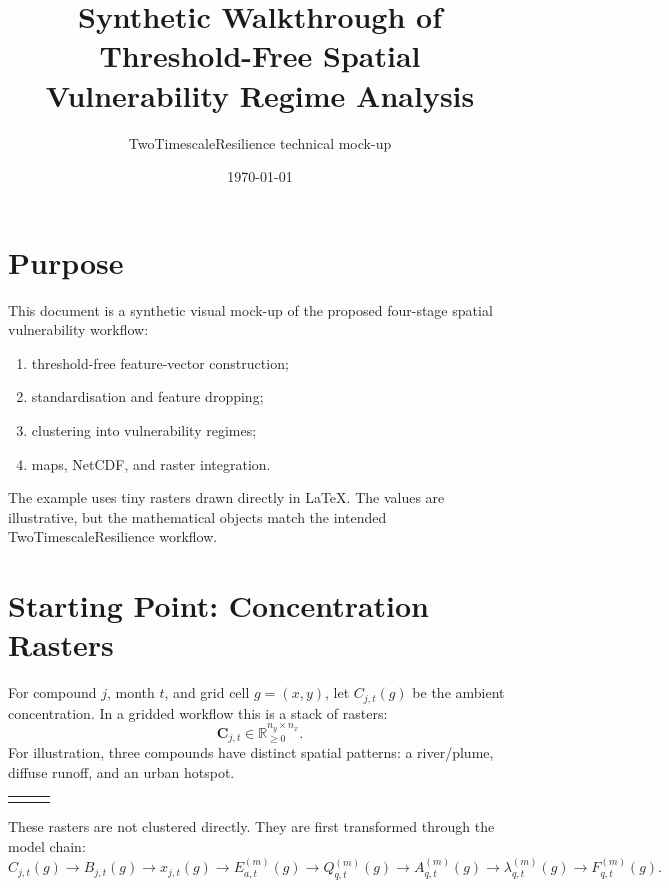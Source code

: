 \documentclass[11pt]{article}
\title{Synthetic Walkthrough of Threshold-Free Spatial Vulnerability Regime Analysis}
\author{TwoTimescaleResilience technical mock-up}
\date{\today}
\newcommand{\cellbox}[2]{\fill[#1] #2 rectangle ++(0.8,0.8);}
\newcommand{\gridframe}{\draw[black!40,step=0.8] (0,0) grid (4,4);}
\newcommand{\rastlabel}[1]{\node[font=\scriptsize,align=center] at (2,-0.35) {#1};}
\newcommand{\drawRasterCOne}{%
\begin{tikzpicture}[scale=0.58]
\cellbox{lowblue}{(0,0)} \cellbox{lowblue}{(0.8,0)} \cellbox{midblue}{(1.6,0)} \cellbox{midblue}{(2.4,0)} \cellbox{highblue}{(3.2,0)}
\cellbox{lowblue}{(0,0.8)} \cellbox{midblue}{(0.8,0.8)} \cellbox{midblue}{(1.6,0.8)} \cellbox{highblue}{(2.4,0.8)} \cellbox{highblue}{(3.2,0.8)}
\cellbox{lowblue}{(0,1.6)} \cellbox{midblue}{(0.8,1.6)} \cellbox{highblue}{(1.6,1.6)} \cellbox{highblue}{(2.4,1.6)} \cellbox{midblue}{(3.2,1.6)}
\cellbox{lowblue}{(0,2.4)} \cellbox{midblue}{(0.8,2.4)} \cellbox{midblue}{(1.6,2.4)} \cellbox{midblue}{(2.4,2.4)} \cellbox{lowblue}{(3.2,2.4)}
\cellbox{lowblue}{(0,3.2)} \cellbox{lowblue}{(0.8,3.2)} \cellbox{lowblue}{(1.6,3.2)} \cellbox{lowblue}{(2.4,3.2)} \cellbox{lowblue}{(3.2,3.2)}
\gridframe\rastlabel{$C_1$: river/plume}
\end{tikzpicture}}
\newcommand{\drawRasterCTwo}{%
\begin{tikzpicture}[scale=0.58]
\cellbox{lowgreen}{(0,0)} \cellbox{lowgreen}{(0.8,0)} \cellbox{lowgreen}{(1.6,0)} \cellbox{midgreen}{(2.4,0)} \cellbox{midgreen}{(3.2,0)}
\cellbox{lowgreen}{(0,0.8)} \cellbox{lowgreen}{(0.8,0.8)} \cellbox{midgreen}{(1.6,0.8)} \cellbox{midgreen}{(2.4,0.8)} \cellbox{highgreen}{(3.2,0.8)}
\cellbox{lowgreen}{(0,1.6)} \cellbox{midgreen}{(0.8,1.6)} \cellbox{midgreen}{(1.6,1.6)} \cellbox{highgreen}{(2.4,1.6)} \cellbox{highgreen}{(3.2,1.6)}
\cellbox{midgreen}{(0,2.4)} \cellbox{midgreen}{(0.8,2.4)} \cellbox{highgreen}{(1.6,2.4)} \cellbox{highgreen}{(2.4,2.4)} \cellbox{midgreen}{(3.2,2.4)}
\cellbox{midgreen}{(0,3.2)} \cellbox{highgreen}{(0.8,3.2)} \cellbox{highgreen}{(1.6,3.2)} \cellbox{midgreen}{(2.4,3.2)} \cellbox{lowgreen}{(3.2,3.2)}
\gridframe\rastlabel{$C_2$: diffuse runoff}
\end{tikzpicture}}
\newcommand{\drawRasterCThree}{%
\begin{tikzpicture}[scale=0.58]
\cellbox{loworange}{(0,0)} \cellbox{loworange}{(0.8,0)} \cellbox{loworange}{(1.6,0)} \cellbox{loworange}{(2.4,0)} \cellbox{loworange}{(3.2,0)}
\cellbox{loworange}{(0,0.8)} \cellbox{midorange}{(0.8,0.8)} \cellbox{midorange}{(1.6,0.8)} \cellbox{loworange}{(2.4,0.8)} \cellbox{loworange}{(3.2,0.8)}
\cellbox{loworange}{(0,1.6)} \cellbox{midorange}{(0.8,1.6)} \cellbox{highorange}{(1.6,1.6)} \cellbox{midorange}{(2.4,1.6)} \cellbox{loworange}{(3.2,1.6)}
\cellbox{loworange}{(0,2.4)} \cellbox{loworange}{(0.8,2.4)} \cellbox{midorange}{(1.6,2.4)} \cellbox{midorange}{(2.4,2.4)} \cellbox{loworange}{(3.2,2.4)}
\cellbox{loworange}{(0,3.2)} \cellbox{loworange}{(0.8,3.2)} \cellbox{loworange}{(1.6,3.2)} \cellbox{loworange}{(2.4,3.2)} \cellbox{loworange}{(3.2,3.2)}
\gridframe\rastlabel{$C_3$: urban hotspot}
\end{tikzpicture}}
\begin{document}
\maketitle

\section{Purpose}
This document is a synthetic visual mock-up of the proposed four-stage spatial vulnerability workflow:
\begin{enumerate}[label=Step \arabic*:,leftmargin=2.5cm]
\item threshold-free feature-vector construction;
\item standardisation and feature dropping;
\item clustering into vulnerability regimes;
\item maps, NetCDF, and raster integration.
\end{enumerate}
The example uses tiny rasters drawn directly in \LaTeX. The values are illustrative, but the mathematical objects match the intended TwoTimescaleResilience workflow.

\section{Starting Point: Concentration Rasters}
For compound $j$, month $t$, and grid cell $g=(x,y)$, let $C_{j,t}(g)$ be the ambient concentration. In a gridded workflow this is a stack of rasters:
\begin{equation}
\mathbf{C}_{j,t}\in\mathbb{R}^{n_y\times n_x}_{\ge 0}.
\end{equation}
For illustration, three compounds have distinct spatial patterns: a river/plume, diffuse runoff, and an urban hotspot.

\begin{center}
\begin{tabular}{ccc}
\drawRasterCOne & \drawRasterCTwo & \drawRasterCThree\\
\end{tabular}
\end{center}

These rasters are not clustered directly. They are first transformed through the model chain:
\begin{equation}
C_{j,t}(g)\rightarrow B_{j,t}(g)\rightarrow x_{j,t}(g)\rightarrow E_{a,t}^{(m)}(g)\rightarrow Q_{q,t}^{(m)}(g)\rightarrow A_{q,t}^{(m)}(g)\rightarrow \lambda_{q,t}^{(m)}(g)\rightarrow F_{q,t}^{(m)}(g).
\end{equation}
\end{document}
